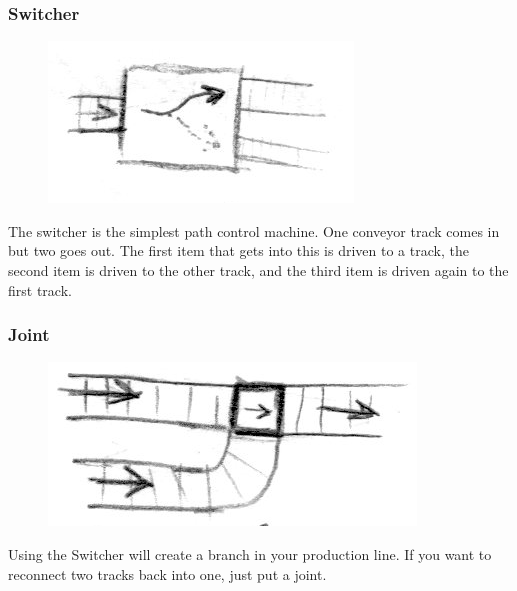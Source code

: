 \documentclass[a4paper]{scrartcl}
\begin{document}
        \subsubsection{Switcher}
            \begin{minipage}[t][4em][t]{\textwidth}
                \begin{figure}
                    \vspace{-20pt}
                    \includegraphics[scale=1]{devices/switcher}
                    \vspace{-15pt}
                \end{figure}

                The switcher is the simplest path control machine. One conveyor
                track comes in but two goes out. The first item that gets into
                this is driven to a track, the second item is driven to the
                other track, and the third item is driven again to the first
                track.
            \end{minipage}

        \subsubsection{Joint}
            \begin{minipage}[t][3em][t]{\textwidth}
                \begin{figure}
                    \vspace{-20pt}
                    \includegraphics[scale=1]{devices/joint}
                    \vspace{-20pt}
                \end{figure}

                Using the Switcher will create a branch in your production line.
                If you want to reconnect two tracks back into one, just put a
                joint.
            \end{minipage}
\end{document}
